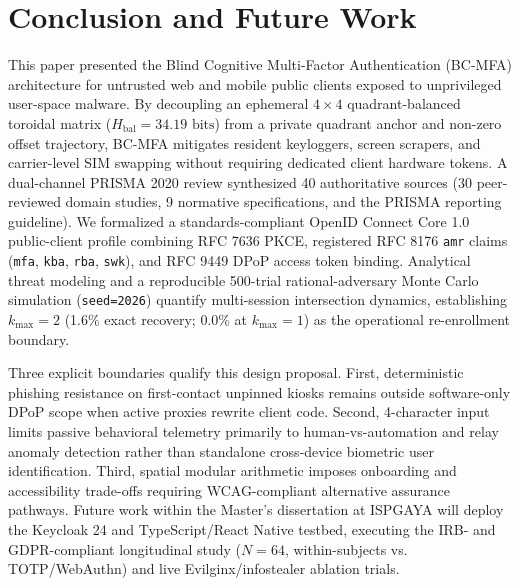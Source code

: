 \section{Conclusion and Future Work}
\label{sec:conclusion}
This paper presented the Blind Cognitive Multi-Factor Authentication (BC-MFA) architecture for untrusted web and mobile public clients exposed to unprivileged user-space malware. By decoupling an ephemeral $4 \times 4$ quadrant-balanced toroidal matrix ($H_{\text{bal}} = 34.19\text{ bits}$) from a private quadrant anchor and non-zero offset trajectory, BC-MFA mitigates resident keyloggers, screen scrapers, and carrier-level SIM swapping without requiring dedicated client hardware tokens. A dual-channel PRISMA 2020 review synthesized 40 authoritative sources (30 peer-reviewed domain studies, 9 normative specifications, and the PRISMA reporting guideline). We formalized a standards-compliant OpenID Connect Core 1.0 public-client profile combining RFC 7636 PKCE, registered RFC 8176 \texttt{amr} claims (\texttt{mfa}, \texttt{kba}, \texttt{rba}, \texttt{swk}), and RFC 9449 DPoP access token binding. Analytical threat modeling and a reproducible 500-trial rational-adversary Monte Carlo simulation (\texttt{seed=2026}) quantify multi-session intersection dynamics, establishing $k_{\max} = 2$ (1.6\% exact recovery; 0.0\% at $k_{\max} = 1$) as the operational re-enrollment boundary.

Three explicit boundaries qualify this design proposal. First, deterministic phishing resistance on first-contact unpinned kiosks remains outside software-only DPoP scope when active proxies rewrite client code. Second, 4-character input limits passive behavioral telemetry primarily to human-vs-automation and relay anomaly detection rather than standalone cross-device biometric user identification. Third, spatial modular arithmetic imposes onboarding and accessibility trade-offs requiring WCAG-compliant alternative assurance pathways. Future work within the Master's dissertation at ISPGAYA will deploy the Keycloak 24 and TypeScript/React Native testbed, executing the IRB- and GDPR-compliant longitudinal study ($N = 64$, within-subjects vs. TOTP/WebAuthn) and live Evilginx/infostealer ablation trials.
